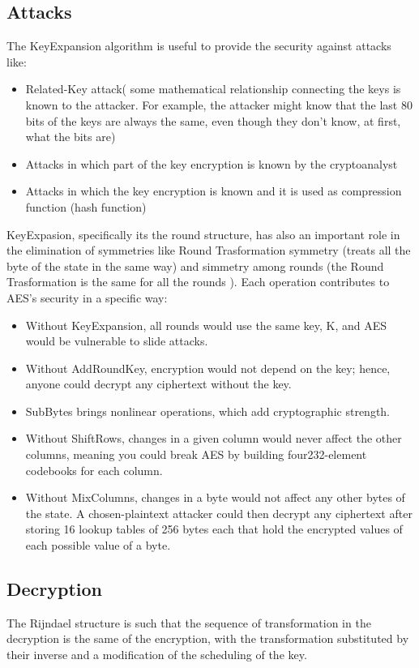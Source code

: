 \documentclass{article}
\begin{document}
\subsection{Attacks}
The KeyExpansion algorithm is useful to provide the security against attacks like:
\begin{itemize}

    \item Related-Key attack( some mathematical relationship connecting the keys is known to the attacker. For example, the attacker might know that the last 80 bits of the keys are always the same, even though they don't know, at first, what the bits are)
    \item Attacks in which part of the key encryption is known by the cryptoanalyst
    \item Attacks in which the key encryption  is known and it is used as compression function (hash function)
\end{itemize}
KeyExpasion, specifically its the round structure, has also an important role in the elimination of symmetries like Round Trasformation symmetry (treats all the byte of the state in the same way) and simmetry among rounds (the Round Trasformation is the same for all the rounds ).
Each operation contributes to AES’s security in a specific way:
\begin{itemize}
    \item	Without KeyExpansion, all rounds would use the same key, K, and AES would be vulnerable to slide attacks.
    \item	Without AddRoundKey, encryption would not depend on the key; hence, anyone could decrypt any ciphertext without the key.
    \item	SubBytes brings nonlinear operations, which add cryptographic strength.
    \item	 Without ShiftRows, changes in a given column would never affect the other columns, meaning you could break AES by building four232-element codebooks for each column. 
    \item	Without MixColumns, changes in a byte would not affect any other bytes of the state. A chosen-plaintext attacker could then decrypt any ciphertext after storing 16 lookup tables of 256 bytes each that hold the encrypted values of each possible value of a byte.
\end{itemize}

\subsection{Decryption}
The Rijndael structure is such that the sequence of transformation in the decryption is the same of the encryption, with the transformation substituted by their inverse and a modification of the scheduling of the key.
\end{document}

